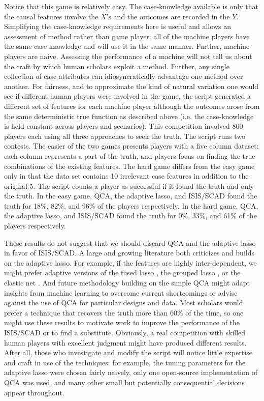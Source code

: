 \documentclass[12pt]{article}
\begin{document}
Notice that this game is relatively easy. The case-knowledge available is only
that the causal features involve the $X$'s and the outcomes are recorded in
the $Y$. Simplifying the case-knowledge requirements here is useful and allows
an assessment of method rather than game player: all of the machine players
have the same case knowledge and will use it in the same manner. Further,
machine players are naive. Assessing the performance of a machine will not
tell us about the craft by which human scholars exploit a method.  Further,
any single collection of case attributes can idiosyncratically advantage one
method over another. For fairness, and to approximate the kind of natural
variation one would see if different human players were involved in the game,
the script generated a different set of features for each machine player
although the outcomes arose from the same deterministic true function as
described above (i.e. the case-knowledge is held constant across players and
scenarios).  This competition involved 800 players each using all three
approaches to seek the truth.  The script runs two contests. The easier of the
two games presents players with a five column dataset: each column represents
a part of the truth, and players focus on finding the true combinations of the
existing features.  The hard game differs from the easy game only in that the
data set contains 10 irrelevant case features in addition to the original 5.  The
script counts a player as successful if it found the truth and only the truth.
In the easy game, QCA, the adaptive lasso, and ISIS/SCAD found the truth for
18\%, 82\%, and 96\% of the players respectively. In the hard game, QCA, the
adaptive lasso, and ISIS/SCAD found the truth for 0\%, 33\%, and 61\% of the
players respectively.

These results do not suggest that we should discard QCA and the adaptive lasso
in favor of ISIS/SCAD.  A large and growing literature both criticizes and
builds on the adaptive lasso. For example, if the features are highly
inter-dependent, we might prefer adaptive versions of the fused lasso
\citep{rinaldo2009properties}, the grouped lasso \citep{wang2008note}, or the
elastic net \citep{ghosh2011grouped, zou2004regression}. And future
methodology building on the simple QCA might adapt insights from machine
learning to overcome current shortcomings or advise against the use of QCA for
particular designs and data.  Most scholars would prefer a technique that
recovers the truth more than 60\% of the time, so one might use these results
to motivate work to improve the performance of the ISIS/SCAD or to find a
substitute. Obviously, a real competition with skilled human players with
excellent judgment might have produced different results.  After all, those
who investigate and modify the script will notice little expertise and craft
in use of the techniques: for example, the tuning parameters for the adaptive
lasso were chosen fairly naively, only one open-source implementation of QCA
was used, and many other small but potentially consequential decisions appear
throughout.
\end{document}
